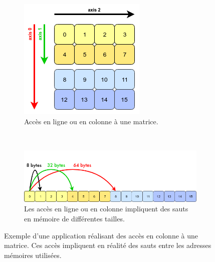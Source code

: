         \begin{figure}[h!]
            \centering
                \begin{subfigure}[b]{0.25\linewidth}
                \includegraphics[width=\linewidth]{images/dml_strides_acces_matrix.png}
                \caption{Accès en ligne ou en colonne à une matrice.}
                \label{pic:dml_strides_acces_matrix}
                \end{subfigure}
            ~ %
                \begin{subfigure}[b]{0.60\linewidth}
                \includegraphics[width=\linewidth]{images/dml_strides_acces.png}
                \caption{Les accès en ligne ou en colonne impliquent des sauts en mémoire de différentes tailles.}
                \label{pic:dml_strides_acces}
                \end{subfigure}
            \caption{Exemple d'une application réalisant des accès en colonne à une matrice. Ces accès impliquent en réalité des sauts entre les adresses mémoires utilisées.}\label{pic:dml_strides_acces_main}
        \end{figure}
    
